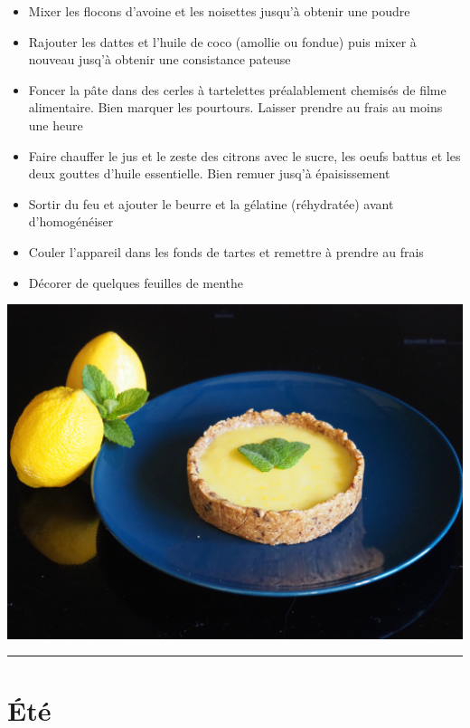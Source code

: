 \documentclass[]{book}
\providecommand{\tightlist}{%
  \setlength{\itemsep}{0pt}\setlength{\parskip}{0pt}}
\begin{document}
\begin{itemize}
\tightlist
\item
  Mixer les flocons d'avoine et les noisettes jusqu'à obtenir une poudre
\item
  Rajouter les dattes et l'huile de coco (amollie ou fondue) puis mixer
  à nouveau jusq'à obtenir une consistance pateuse
\item
  Foncer la pâte dans des cerles à tartelettes préalablement chemisés de
  filme alimentaire. Bien marquer les pourtours. Laisser prendre au
  frais au moins une heure
\item
  Faire chauffer le jus et le zeste des citrons avec le sucre, les oeufs
  battus et les deux gouttes d'huile essentielle. Bien remuer jusq'à
  épaisissement
\item
  Sortir du feu et ajouter le beurre et la gélatine (réhydratée) avant
  d'homogénéiser
\item
  Couler l'appareil dans les fonds de tartes et remettre à prendre au
  frais
\item
  Décorer de quelques feuilles de menthe
\end{itemize}

\begin{center}\includegraphics[width=0.9\linewidth]{photos/citron_menthe} \end{center}

\begin{center}\rule{0.5\linewidth}{0.5pt}\end{center}

\chapter*{Été}\label{uxe9tuxe9}
\end{document}

